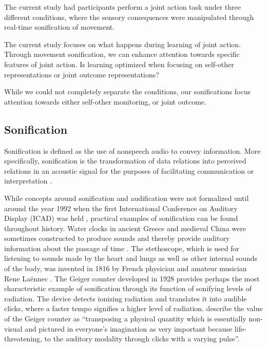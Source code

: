 \documentclass[10pt,a4paper,onecolumn]{article}
\begin{document}
The current study had participants perform a joint action task under three different conditions, where the sensory consequences were manipulated through real-time sonification of movement.

The current study focuses on what happens during learning of joint action. Through movement sonification, we can enhance attention towards specific features of joint action. Is learning optimized when focusing on self-other representations or joint outcome representations?

While we could not completely separate the conditions, our sonifications focus attention towards either self-other monitoring, or joint outcome.

\hypertarget{sonification}{%
\subsection{Sonification}\label{sonification}}

Sonification is defined as the use of nonspeech audio to convey information. More specifically, sonification is the transformation of data relations into perceived relations in an acoustic signal for the purposes of facilitating communication or interpretation \autocite[p.~4]{kramerSonificationReportStatus1999}.

While concepts around sonification and audification were not formalized until around the year 1992 when the first International Conference on Auditory Display (ICAD) was held \autocite{dubusSonificationPhysicalQuantities2011}, practical examples of sonification can be found throughout history. Water clocks in ancient Greece and medieval China were sometimes constructed to produce sounds and thereby provide auditory information about the passage of time \autocite{dubusSonificationPhysicalQuantities2011}. The stethoscope, which is used for listening to sounds made by the heart and lungs as well as other internal sounds of the body, was invented in 1816 by French physician and amateur musician Rene Laënnec \autocite{roguinReneTheophileHyacinthe2006}. The Geiger counter developed in 1928 provides perhaps the most characteristic example of sonification through its function of sonifying levels of radiation. The device detects ionizing radiation and translates it into audible clicks, where a faster tempo signifies a higher level of radiation. \textcite{dubusSonificationPhysicalQuantities2011} describe the value of the Geiger counter as ``transposing a physical quantity which is essentially non-visual and pictured in everyone's imagination as very important because life-threatening, to the auditory modality through clicks with a varying pulse''.
\end{document}
